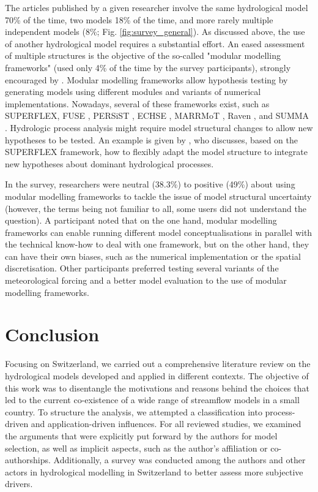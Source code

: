 \documentclass[10pt,a4paper]{article}
\begin{document}
The articles published by a given researcher involve the same hydrological model 70\% of the time, two models 18\% of the time, and more rarely multiple independent models (8\%; Fig. \ref{fig:survey_general}). As discussed above, the use of another hydrological model requires a substantial effort. An eased assessment of multiple structures is the objective of the so-called "modular modelling frameworks" (used only 4\% of the time by the survey participants), strongly encouraged by \citet{Clark2011a}. Modular modelling frameworks allow hypothesis testing by generating models using different modules and variants of numerical implementations. Nowadays, several of these frameworks exist, such as SUPERFLEX, FUSE \citep{Clark2008}, PERSiST \citep{Futter2014}, ECHSE \citep{Kneis2015}, MARRMoT \citep{Knoben2019}, Raven \citep{Craig2020}, and SUMMA \citep{Clark2015}. Hydrologic process analysis might require model structural changes to allow new hypotheses to be tested. An example is given by \citet{DalMolin2020}, who discusses, based on the SUPERFLEX framework, how to flexibly adapt the model structure to integrate new hypotheses about dominant hydrological processes. 

In the survey, researchers were neutral (38.3\%) to positive (49\%) about using modular modelling frameworks to tackle the issue of model structural uncertainty (however, the terms being not familiar to all, some users did not understand the question). A participant noted that on the one hand, modular modelling frameworks can enable running different model conceptualisations in parallel with the technical know-how to deal with one framework, but on the other hand, they can have their own biases, such as the numerical implementation or the spatial discretisation. Other participants preferred testing several variants of the meteorological forcing and a better model evaluation to the use of modular modelling frameworks.


\section{Conclusion}
\label{sec:conclusion}

Focusing on Switzerland, we carried out a comprehensive literature review on the hydrological models developed and applied in different contexts. The objective of this work was to disentangle the motivations and reasons behind the choices that led to the current co-existence of a wide range of streamflow models in a small country. To structure the analysis, we attempted a classification into process-driven and application-driven influences. For all reviewed studies, we examined the arguments that were explicitly put forward by the authors for model selection, as well as implicit aspects, such as the author's affiliation or co-authorships. Additionally, a survey was conducted among the authors and other actors in hydrological modelling in Switzerland to better assess more subjective drivers.
\end{document}
